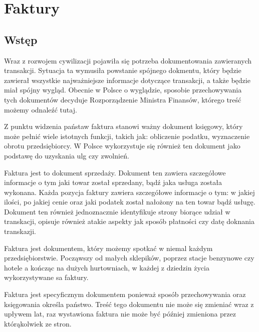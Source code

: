 \documentclass[12pt, a4paper]{article}
\begin{document}
\section{Faktury}
\subsection{Wstęp}
Wraz z rozwojem cywilizacji pojawiła się potrzeba dokumentowania zawieranych
transakcji. Sytuacja ta wymusiła powstanie spójnego dokmentu, który będzie
zawierał wszystkie najważniejsze informacje dotyczące transakcji, a także będzie
miał spójny wygląd. Obecnie w Polsce o wyglądzie, sposobie przechowywania tych
dokumentów decyduje Rozporządzenie Ministra
Finansów, którego treść możemy odnaleźć tutaj\cite{RozporzadzenieFaktury}.

Z punktu widzenia państaw faktura stanowi ważny dokument księgowy, który może
pełnić wiele istotnych funkcji, takich jak: obliczenie podatku,
wyznaczenie obrotu przedsiębiorcy. W Polsce wykorzystuje się również ten
dokument jako podstawę do uzyskania ulg czy zwolnień.



Faktura jest to dokument sprzedaży. Dokument ten zawiera szczegółowe informacje
o tym jaki towar został sprzedany, bądź jaka usługa została wykonana. Każda
pozycja faktury zawiera szczegółowe informacje o tym: w jakiej
ilości, po jakiej cenie oraz jaki podatek został nałożony na ten towar bądź
usługę.
Dokument ten również jednoznacznie identyfikuje strony biorące udział w
transkacji, opisuje również atakie aspekty jak sposób płatności czy datę
doknania transkazji.

Faktura jest dokumentem, który możemy spotkać w niemal każdym przedsiębiorstwie.
Począwszy od małych sklepików, poprzez stacje benzynowe czy hotele a kończąc na dużych
hurtowniach, w każdej z dziedzin życia wykorzystywane sa faktury.

Faktura jest specyficznym dokumentem ponieważ sposób
przechowywania oraz księgowania określa państwo. Treść tego dokumentu nie
może się zmieniać wraz z upływem lat, raz wystawiona faktura nie może być
później zmieniona przez którąkolwiek ze stron. 
\end{document}
